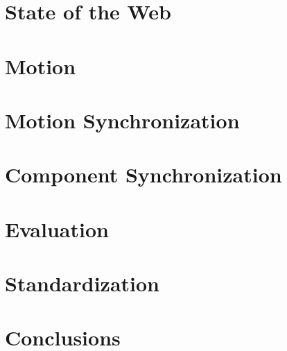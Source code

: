 \documentclass[graybox]{svmult}
\begin{document}
\section{State of the Web}
\label{sec:web}


\section{Motion}
\label{sec:motion}


\section{Motion Synchronization}
\label{sec:motionsync}


\section{Component Synchronization}
\label{sec:compsync}


\section{Evaluation}
\label{sec:eval}


\section{Standardization}
\label{sec:standard}


\section{Conclusions}
\label{sec:concl}



 
\end{document}
